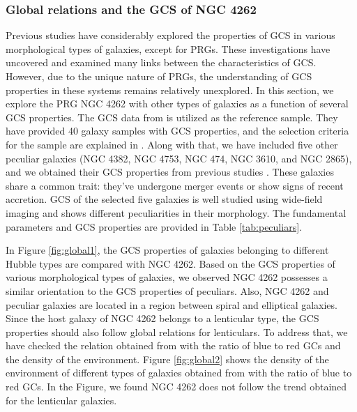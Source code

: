 \documentclass[fleqn,usenatbib]{mnras}
\begin{document}
\subsubsection{Global relations and the GCS of NGC 4262}
\label{section:correlations}
Previous studies \citep[][and reference therein]{brodie2006,2007Rhode,2016Kartha,2019caso,2022debortoli} have considerably explored the properties of GCS in various morphological types of galaxies, except for PRGs. These investigations have uncovered and examined many links between the characteristics of GCS. However, due to the unique nature of PRGs, the understanding of GCS properties in these systems remains relatively unexplored. In this section, we explore the PRG NGC 4262 with other types of galaxies as a function of several GCS properties. The GCS data from \citet{sreeja2014} is utilized as the reference sample. They have provided 40 galaxy samples with GCS properties, and the selection criteria for the sample are explained in \citet[][see section 4]{sreeja2014}. Along with that, we have included five other peculiar galaxies (NGC 4382, NGC 4753,  NGC 474,  NGC 3610, and NGC 2865), and we obtained their GCS properties from previous studies \citep{2006Sikkema,2015Salinas,2015Caso,2017Lim,2017Bassinoandcaso,2022Escudero}. These galaxies share a common trait: they've undergone merger events or show signs of recent accretion. 
GCS of the selected five galaxies is well studied using wide-field imaging and shows different peculiarities in their morphology. The fundamental parameters and GCS properties are provided in Table \ref{tab:peculiars}. \par

In Figure \ref{fig:global1}, the GCS properties of galaxies belonging to different Hubble types are compared with NGC 4262. Based on the GCS properties of various morphological types of galaxies, we observed NGC 4262 possesses a similar orientation to the GCS properties of peculiars. Also, NGC 4262 and peculiar galaxies are located in a region between spiral and elliptical galaxies. Since the host galaxy of NGC 4262 belongs to a lenticular type, the GCS properties should also follow global relations for lenticulars. To address that, we have checked the relation obtained from \citet{sreeja2014} with the ratio of blue to red GCs and the density of the environment. Figure \ref{fig:global2} shows the density of the environment of different types of galaxies obtained from \citet{1988Tully} with the ratio of blue to red GCs. In the Figure, we found NGC 4262 does not follow the trend obtained for the lenticular galaxies.
\end{document}
